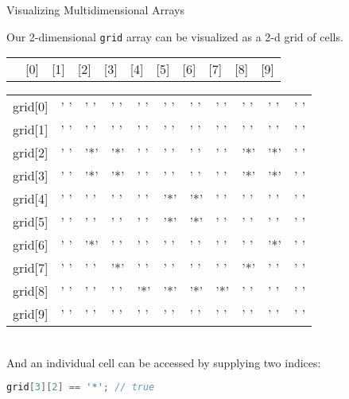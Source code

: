\documentclass[xcolor={table}]{beamer}
\begin{document}
\begin{frame}[fragile]{Visualizing Multidimensional Arrays}


Our 2-dimensional {\tt grid} array can be visualized as a 2-d grid of cells.\\
\vspace{.1in}
\begin{tabular}{p{.4in}p{.2in}p{.2in}p{.2in}p{.2in}p{.2in}p{.2in}p{.2in}p{.2in}p{.2in}p{.2in}}
         & [0] & [1] & [2] & [3] & [4] & [5] & [6] & [7] & [8] & [9]
\end{tabular}
\begin{tabular}{p{.4in}|p{.2in}|p{.2in}|p{.2in}|p{.2in}|p{.2in}|p{.2in}|p{.2in}|p{.2in}|p{.2in}|p{.2in}|}\cline{2-11}
grid[0] & ' ' & ' ' & ' ' & ' ' & ' ' & ' ' & ' ' & ' ' & ' ' & ' ' \\
\cline{2-11}
grid[1] & ' ' & ' ' & ' ' & ' ' & ' ' & ' ' & ' ' & ' ' & ' ' & ' ' \\
\cline{2-11}
grid[2] & ' ' & '*' & '*' & ' ' & ' ' & ' ' & ' ' & '*' & '*' & ' ' \\
\cline{2-11}
grid[3] & ' ' & '*' & \cellcolor{yellow}'*' & ' ' & ' ' & ' ' & ' ' & '*' & '*' & ' ' \\
\cline{2-11}
grid[4] & ' ' & ' ' & ' ' & ' ' & '*' & '*' & ' ' & ' ' & ' ' & ' ' \\
\cline{2-11}
grid[5] & ' ' & ' ' & ' ' & ' ' & '*' & '*' & ' ' & ' ' & ' ' & ' ' \\
\cline{2-11}
grid[6] & ' ' & '*' & ' ' & ' ' & ' ' & ' ' & ' ' & ' ' & '*' & ' ' \\
\cline{2-11}
grid[7] & ' ' & ' ' & '*' & ' ' & ' ' & ' ' & ' ' & '*' & ' ' & ' ' \\
\cline{2-11}
grid[8] & ' ' & ' ' & ' ' & '*' & '*' & '*' & '*' & ' ' & ' ' & ' ' \\
\cline{2-11}
grid[9] & ' ' & ' ' & ' ' & ' ' & ' ' & ' ' & ' ' & ' ' & ' ' & ' ' \\
\cline{2-11}
\end{tabular}\\
\vspace{.1in}
And an individual cell can be accessed by supplying two indices:

\begin{lstlisting}[language=Java]
grid[3][2] == '*'; // true
\end{lstlisting}

\end{frame}
\end{document}
